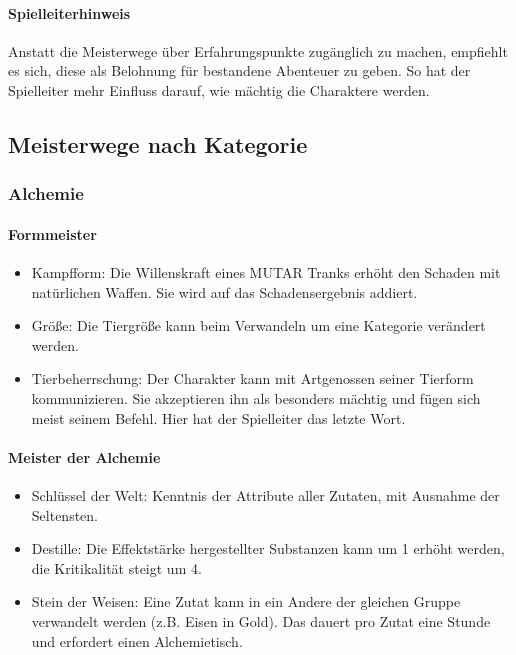\documentclass{article}
\begin{document}
\begin{mdframed}[hidealllines=true, backgroundcolor=black!10]
\paragraph{Spielleiterhinweis}

Anstatt die Meisterwege über Erfahrungspunkte zugänglich zu machen, empfiehlt es sich, diese als Belohnung für
bestandene Abenteuer zu geben. So hat der Spielleiter mehr Einfluss darauf, wie mächtig die Charaktere werden.

\end{mdframed}
\begin{center}
\subsection{Meisterwege nach Kategorie}
\end{center}

\subsubsection{Alchemie}

\paragraph{Formmeister}

\begin{itemize}
\item Kampfform: Die Willenskraft eines MUTAR Tranks erhöht den Schaden mit natürlichen Waffen. Sie wird auf das Schadensergebnis addiert.
\item Größe: Die Tiergröße kann beim Verwandeln um eine Kategorie verändert werden.
\item Tierbeherrschung: Der Charakter kann mit Artgenossen seiner Tierform kommunizieren. Sie akzeptieren ihn als besonders mächtig und fügen sich meist seinem Befehl. Hier hat der Spielleiter das letzte Wort.
\end{itemize}

\paragraph{Meister der Alchemie}

\begin{itemize}
\item Schlüssel der Welt: Kenntnis der Attribute aller Zutaten, mit Ausnahme der Seltensten.
\item Destille: Die Effektstärke hergestellter Substanzen kann um 1 erhöht werden, die Kritikalität steigt um 4.
\item Stein der Weisen: Eine Zutat kann in ein Andere der gleichen Gruppe verwandelt werden (z.B. Eisen in Gold). Das dauert pro Zutat eine Stunde und erfordert einen Alchemietisch.
\end{itemize}
\end{document}
